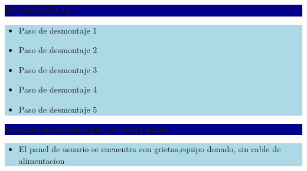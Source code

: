 \documentclass[11pt]{article}
\newcommand{\seccionbanda}[1]{%
  \vspace{0.6em}
  \noindent\colorbox{darkblue}{\parbox{\dimexpr\linewidth-2\fboxsep}{%
    \centering\color{white}\bfseries #1}}\par\vspace{0.6em}
}
\begin{document}
\seccionbanda{DESMONTAJE}
\noindent\colorbox{lightblue}{\parbox{\dimexpr\linewidth-2\fboxsep\relax}{%
\begin{itemize}[label=$\square$, itemsep=4pt]
\item Paso de desmontaje 1
\item Paso de desmontaje 2
\item Paso de desmontaje 3
\item Paso de desmontaje 4
\item Paso de desmontaje 5
\end{itemize}
}}\par
\seccionbanda{OBSERVACIONES EN INVENTARIO}
\noindent\colorbox{lightblue}{\parbox{\dimexpr\linewidth-2\fboxsep\relax}{\begin{itemize}[itemsep=4pt]
\item El panel de usuario se encuentra con grietas,equipo donado, sin cable de alimentacion
\end{itemize}}}\par
\end{document}

